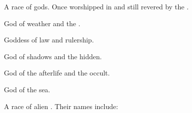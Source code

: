 \begin{gloss}
\begin{comment}
\paragraph{\Taortha}
\end{comment}
\gitem[\Taorthae]{\Taortha}
A race of gods. 
Once worshipped in  and still revered by the . 
  
\begin{gloss}
  \begin{comment}
  \subparagraph{Daxian}
  \end{comment}
    God of weather and the \Wylde{}. 
    
  \begin{comment}
  \subparagraph{Isxae}
  \end{comment}
    Goddess of law and rulership. 
  
  \begin{comment}
  \subparagraph{\Nasshikerr}
  \end{comment}
  \gitem{\Nasshikerr}
    God of shadows and the hidden. 
  
  \begin{comment}
  \subparagraph{\NerrhanKoss}
  \end{comment}
  \gitem{\NerrhanKoss}
    God of the afterlife and the occult. 

  \begin{comment}
  \subparagraph{Shellagh}
  \end{comment}
    God of the sea. 
\end{gloss}








\begin{comment}
\paragraph{\xzaishann}
\end{comment}
\gitem[\xzaishanns]{\xzaishann}
A race of alien . 
Their names include:

\begin{gloss}
  \begin{comment}
  \subparagraph{\KhothSell}
  \end{comment}
  \gitem{\KhothSell} 
  

\end{gloss}
\end{gloss}
